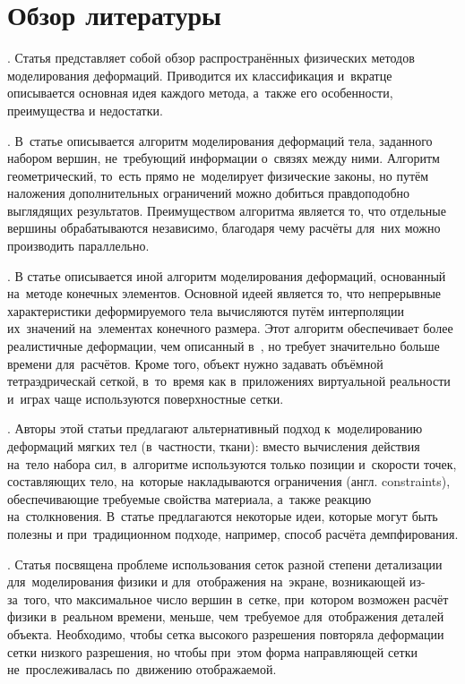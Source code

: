 \documentclass[a4paper,11pt]{report}
\begin{document}
  \chapter{Обзор литературы}

    \cite[Physically Based Deformable Models...]{muller-physmodels}. Статья представляет собой
      обзор распространённых физических методов моделирования деформаций. Приводится их классификация
      и~вкратце описывается основная идея каждого метода, а~также его особенности,
      преимущества и недостатки.

    \cite[Meshless Deformations...]{muller-meshless}. В~статье описывается алгоритм
      моделирования деформаций тела, заданного набором вершин, не~требующий информации о~связях
      между ними. Алгоритм геометрический, то~есть прямо не~моделирует физические законы, но путём
      наложения дополнительных ограничений можно добиться правдоподобно выглядящих результатов.
      Преимуществом алгоритма является то, что отдельные вершины обрабатываются независимо,
      благодаря чему расчёты для~них можно производить параллельно.

    \cite[Stable Real-Time Deformations]{muller-stable}. В статье описывается иной алгоритм
      моделирования деформаций, основанный на~методе конечных элементов. Основной идеей является то,
      что непрерывные характеристики деформируемого тела вычисляются путём интерполяции их~значений
      на~элементах конечного размера. Этот алгоритм обеспечивает более реалистичные деформации, чем
      описанный в~\cite{muller-meshless}, но требует значительно больше времени для~расчётов. Кроме
      того, объект нужно задавать объёмной тетраэдрическай сеткой, в~то~время как в~приложениях
      виртуальной реальности и~играх чаще используются поверхностные сетки.

    \cite[Position Based Dynamics]{muller-position-dynamics}. Авторы этой статьи предлагают
      альтернативный подход к~моделированию деформаций мягких тел (в~частности, ткани): вместо
      вычисления действия на~тело набора сил, в~алгоритме используются только позиции и~скорости
      точек, составляющих тело, на~которые накладываются ограничения (англ. {\English constraints}),
      обеспечивающие требуемые свойства материала, а~также реакцию на~столкновения. В~статье
      предлагаются некоторые идеи, которые могут быть полезны и при~традиционном подходе, например,
      способ расчёта демпфирования.

    \cite[Deforming a High-Resolution Mesh...]{visser-mapping}. Статья посвящена проблеме
      использования сеток разной степени детализации для~моделирования физики и для~отображения
      на~экране, возникающей из-за~того, что максимальное число вершин в~сетке, при~котором возможен
      расчёт физики в~реальном времени, меньше, чем~требуемое для~отображения деталей объекта.
      Необходимо, чтобы сетка высокого разрешения повторяла деформации сетки низкого разрешения, но
      чтобы при~этом форма направляющей сетки не~прослеживалась по~движению отображаемой.
\end{document}
